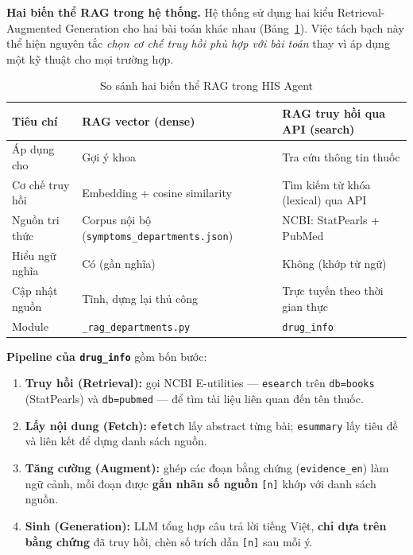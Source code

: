 \documentclass[a4paper,13pt,3p,twoside,openany]{report}
\theoremstyle{definition}
\theoremstyle{remark}
\theoremstyle{definition}
\begin{document}
\textbf{Hai biến thể RAG trong hệ thống.} Hệ thống sử dụng hai kiểu Retrieval-Augmented Generation cho hai bài toán khác nhau (Bảng~\ref{tab:rag-compare}). Việc tách bạch này thể hiện nguyên tắc \textit{chọn cơ chế truy hồi phù hợp với bài toán} thay vì áp dụng một kỹ thuật cho mọi trường hợp.

\begin{table}[H]
\centering
\begin{tabular}{|p{3.2cm}|p{5.0cm}|p{5.0cm}|}
\hline
\textbf{Tiêu chí} & \textbf{RAG vector (dense)} & \textbf{RAG truy hồi qua API (search)} \\
\hline
Áp dụng cho & Gợi ý khoa & Tra cứu thông tin thuốc \\
\hline
Cơ chế truy hồi & Embedding + cosine similarity & Tìm kiếm từ khóa (lexical) qua API \\
\hline
Nguồn tri thức & Corpus nội bộ (\texttt{symptoms\_departments.json}) & NCBI: StatPearls + PubMed \\
\hline
Hiểu ngữ nghĩa & Có (gần nghĩa) & Không (khớp từ ngữ) \\
\hline
Cập nhật nguồn & Tĩnh, dựng lại thủ công & Trực tuyến theo thời gian thực \\
\hline
Module & \texttt{\_rag\_departments.py} & \texttt{drug\_info} \\
\hline
\end{tabular}
\caption{So sánh hai biến thể RAG trong HIS Agent}
\label{tab:rag-compare}
\end{table}

\textbf{Pipeline của \texttt{drug\_info}} gồm bốn bước:
\begin{enumerate}
  \item \textbf{Truy hồi (Retrieval):} gọi NCBI E-utilities --- \texttt{esearch} trên \texttt{db=books} (StatPearls) và \texttt{db=pubmed} --- để tìm tài liệu liên quan đến tên thuốc.
  \item \textbf{Lấy nội dung (Fetch):} \texttt{efetch} lấy abstract từng bài; \texttt{esummary} lấy tiêu đề và liên kết để dựng danh sách nguồn.
  \item \textbf{Tăng cường (Augment):} ghép các đoạn bằng chứng (\texttt{evidence\_en}) làm ngữ cảnh, mỗi đoạn được \textbf{gắn nhãn số nguồn} \texttt{[n]} khớp với danh sách nguồn.
  \item \textbf{Sinh (Generation):} LLM tổng hợp câu trả lời tiếng Việt, \textbf{chỉ dựa trên bằng chứng} đã truy hồi, chèn số trích dẫn \texttt{[n]} sau mỗi ý.
\end{enumerate}
\end{document}
